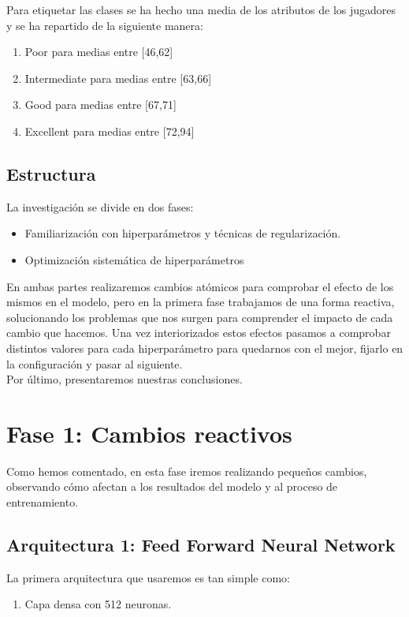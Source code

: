 \documentclass{article}
\begin{document}
	Para etiquetar las clases se ha hecho una media de los atributos de los jugadores y se ha repartido de la siguiente manera: 
	\begin{enumerate}
		\item Poor para medias entre [46,62]
    	\item Intermediate para medias entre [63,66]
    	\item Good para medias entre [67,71]
    	\item Excellent para medias entre [72,94]
	\end{enumerate}
	
	\subsection{Estructura}
		La investigaci\'on se divide en dos fases:
		\begin{itemize}
			\item Familiarizaci\'on con hiperpar\'ametros y t\'ecnicas de regularizaci\'on.
			\item Optimizaci\'on sistem\'atica de hiperpar\'ametros
		\end{itemize}
		
		En ambas partes realizaremos cambios at\'omicos para comprobar el efecto de los mismos en el modelo, pero en la primera fase trabajamos de una forma reactiva, solucionando los problemas que nos surgen para comprender el impacto de cada cambio que hacemos. Una vez interiorizados estos efectos pasamos a comprobar distintos valores para cada hiperpar\'ametro para quedarnos con el mejor, fijarlo en la configuraci\'on y pasar al siguiente.\\
		
		Por \'ultimo, presentaremos nuestras conclusiones.

\section{Fase 1: Cambios reactivos}
	Como hemos comentado, en esta fase iremos realizando peque\~nos cambios, observando c\'omo afectan a los resultados del modelo y al proceso de entrenamiento.
	\subsection{Arquitectura 1: Feed Forward Neural Network}
	\label{d-s-a1}
		La primera arquitectura que usaremos es tan simple como:
		\begin{enumerate}
			\item Capa densa con 512 neuronas.
		\end{enumerate}
\end{document}
